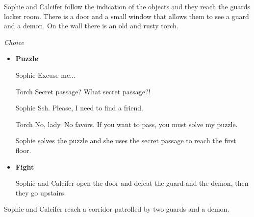 \vspace{1em}


Sophie and Calcifer follow the indication of the objects and they reach the guards locker room. There is a door and a small window that allows them to see a guard and a demon. On the wall there is an old and rusty torch.

\textit{Choice}
\begin{itemize}
  \item \textbf{Puzzle}
  
\begin{screenplay}

\begin{dialogue}{Sophie}
Excuse me...
\end{dialogue}

\begin{dialogue}{Torch}
Secret passage? What secret passage?!
\end{dialogue}

\begin{dialogue}{Sophie}
Ssh. Please, I need to find a friend.
\end{dialogue}

\begin{dialogue}[determined]{Torch}
No, lady. No favors. If you want to pass, you must solve my puzzle.
\end{dialogue}

\end{screenplay}
\vspace{1em}

    Sophie solves the puzzle and she uses the secret passage to reach the first floor.

  \item \textbf{Fight}
  
  Sophie and Calcifer open the door and defeat the guard and the demon, then they go upstairs.
\end{itemize}


Sophie and Calcifer reach a corridor patrolled by two guards and a demon.

